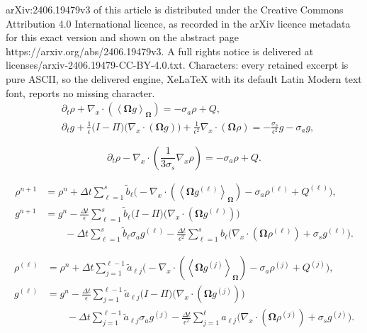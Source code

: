 \documentclass[10pt,a4paper]{amsart}
\begin{document}
arXiv:2406.19479v3 of this article is distributed under the Creative Commons Attribution 4.0 International licence, as recorded in the arXiv licence metadata for this exact version and shown on the abstract page https://arxiv.org/abs/2406.19479v3. A full rights notice is delivered at licenses/arxiv-2406.19479-CC-BY-4.0.txt. Characters: every retained excerpt is pure ASCII, so the delivered engine, XeLaTeX with its default Latin Modern text font, reports no missing character.
\begin{align}
    &\partial_{t} \rho + \nabla_{x} \cdot \left( \left\langle \mathbf{\Omega} g \right\rangle_{\mathbf{\Omega}} \right) = - \sigma_{a} \rho + Q, \label{eq:macro} \\
    &\partial_{t} g + \frac{1}{\epsilon} \Big( I - \Pi \Big) \Big( \nabla_{x} \cdot \left(  \mathbf{\Omega} g \right) \Big) + \frac{1}{\epsilon^{2}}\nabla_{x} \cdot \left( \mathbf{\Omega} \rho \right) = -\frac{\sigma_{s}}{\epsilon^{2}} g - \sigma_{a} g, \label{eq:micro}
\end{align}

    \begin{equation}
        \label{eq:diffusion limit}
        \partial_t \rho - \nabla_x \cdot \left( \frac{1}{3 \sigma_s} \nabla_x \rho \right) = - \sigma_a \rho + Q.
    \end{equation}

\begin{align}
    \rho^{n+1} &= \rho^{n}  + \Delta t \sum_{\ell=1}^{s} \widetilde{b}_{\ell} \Bigg( -\nabla_{x} \cdot \left( \left\langle \mathbf{\Omega} g^{(\ell)} \right\rangle_{\mathbf{\Omega}} \right) - \sigma_{a} \rho^{(\ell)} + Q^{(\ell)} \Bigg), \label{eq:IMEX rho final} \\
    g^{n+1} &= g^{n} - \frac{\Delta t}{\epsilon} \sum_{\ell=1}^{s} \widetilde{b}_{\ell} \Big( I - \Pi \Big) \Big( \nabla_{x} \cdot \left(  \mathbf{\Omega} g^{(\ell)} \right) \Big) \label{eq:IMEX g final} \\ 
    &\qquad - \Delta t \sum_{\ell=1}^{s} \widetilde{b}_{\ell} \sigma_{a} g^{(\ell)} - \frac{\Delta t}{\epsilon^{2}} \sum_{\ell=1}^{s} b_{\ell} \Big( \nabla_{x} \cdot \left( \mathbf{\Omega} \rho^{(\ell)} \right) + \sigma_{s} g^{(\ell)} \Big). \nonumber
\end{align}

\begin{align}
    \rho^{(\ell)} &= \rho^{n}  + \Delta t \sum_{j=1}^{\ell-1} \widetilde{a}_{\ell j} \Big( -\nabla_{x} \cdot \left( \left\langle \mathbf{\Omega} g^{(j)} \right\rangle_{\mathbf{\Omega}} \right) - \sigma_{a} \rho^{(j)} + Q^{(j)} \Big), \label{eq: IMEX rho stage} \\
    g^{(\ell)} &= g^{n} - \frac{\Delta t}{\epsilon} \sum_{j=1}^{\ell-1} \widetilde{a}_{\ell j} \Big( I - \Pi \Big) \Big( \nabla_{x} \cdot \left(  \mathbf{\Omega} g^{(j)} \right) \Big) \label{eq: IMEX g stage} \\ 
    &\qquad - \Delta t \sum_{j=1}^{\ell-1} \widetilde{a}_{\ell j} \sigma_{a} g^{(j)} - \frac{\Delta t}{\epsilon^2} \sum_{j=1}^{\ell} a_{\ell j} \Bigg( \nabla_{x} \cdot \left( \mathbf{\Omega} \rho^{(j)} \right) + \sigma_{s} g^{(j)} \Bigg). \nonumber
\end{align}
\end{document}
